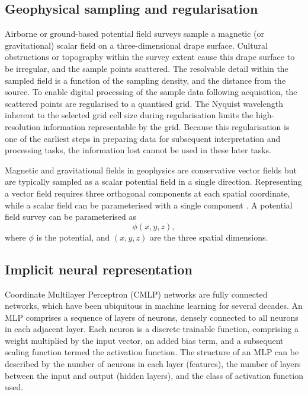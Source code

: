 \documentclass[manuscript.tex]{subfiles}
\begin{document}
\subsection{Geophysical sampling and regularisation}
\label{sec:geo_airborne}
Airborne or ground-based potential field surveys sample a magnetic (or gravitational) scalar field on a three-dimensional drape surface.
Cultural obstructions or topography within the survey extent cause this drape surface to be irregular, and the sample points scattered.
The resolvable detail within the sampled field is a function of the sampling density, and the distance from the source.
To enable digital processing of the sample data following acquisition, the scattered points are regularised to a quantised grid.
The Nyquist wavelength inherent to the selected grid cell size during regularisation limits the high-resolution information representable by the grid.
Because this regularisation is one of the earliest steps in preparing data for subsequent interpretation and processing tasks, the information lost cannot be used in these later tasks.

\label{sec:geo_physics}
Magnetic and gravitational fields in geophysics are conservative vector fields but are typically sampled as a scalar potential field in a single direction.
Representing a vector field requires three orthogonal components at each spatial coordinate, while a scalar field can be parameterised with a single component \parencite{blakelyPotentialTheoryGravity1996}.
A potential field survey can be parameterised as
\begin{equation}
    \label{eqn:potential}
    \phi\left(x,y,z\right),
\end{equation}
where \(\phi{}\) is the potential, and \({(x,y,z)}\) are the three spatial dimensions.

\subsection{Implicit neural representation}
\label{sec:inr}
Coordinate Multilayer Perceptron (CMLP) networks are fully connected networks, which have been ubiquitous in machine learning for several decades.
An MLP comprises a sequence of layers of neurons, densely connected to all neurons in each adjacent layer.
Each neuron is a discrete trainable function, comprising a weight multiplied by the input vector, an added bias term, and a subsequent scaling function termed the activation function.
The structure of an MLP can be described by the number of neurons in each layer (features), the number of layers between the input and output (hidden layers), and the class of activation function used.
\end{document}
